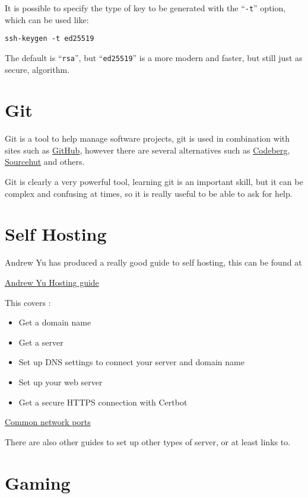 \documentclass{extbook}
\begin{document}
It is possible to specify the type of key to be generated with the ``\verb|-t|'' option, which can be used like:

\begin{verbatim}
ssh-keygen -t ed25519
\end{verbatim}

The default is ``\verb|rsa|'', but ``\verb|ed25519|'' is a more modern and faster, but still just as secure, algorithm.

\section{Git}

Git is a tool to help manage software projects, git is used in combination with sites such as \href{https://github.com/}{GitHub}, however there are several alternatives such as
\href{https://codeberg.org/}{Codeberg}, \href{https://sr.ht/}{Sourcehut} and others.

Git is clearly a very powerful tool, learning git is an important skill, but it can be complex and confusing at times, so it is really useful to be able to ask for help.



\section{Self Hosting}

Andrew Yu has produced a really good guide to self hosting, this can be found at

\href{https://host.andrewyu.org/}{Andrew Yu Hosting guide}

This covers :

\begin{itemize}
\item Get a domain name
\item Get a server
\item Set up DNS settings to connect your server and domain name
\item Set up your web server
\item Get a secure HTTPS connection with Certbot
\end{itemize}

\href{https://networkverge.com/common-ports/}{Common network ports}

There are also other guides to set up other types of server, or at least links to.

\section{Gaming}
\end{document}
